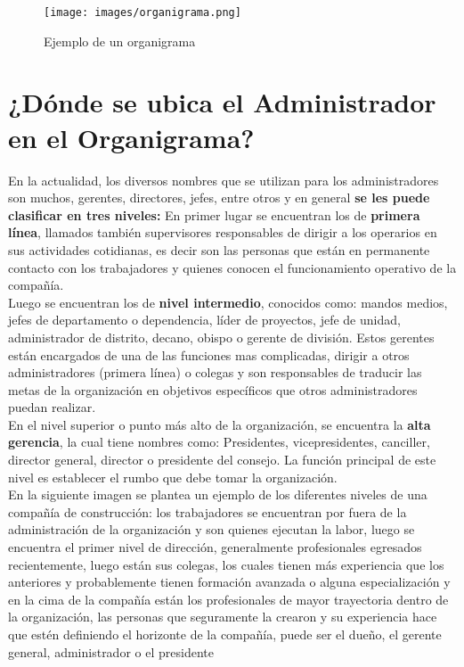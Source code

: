 \documentclass[letterpaper,12pt]{article}
\begin{document}
\begin{sloppypar}
\begin{figure}[H]
    \centering 
    \texttt{[image: images/organigrama.png]}
    \caption{Ejemplo de un organigrama}
\end{figure}

\section{¿Dónde se ubica el Administrador en el Organigrama?}
En la actualidad, los diversos nombres que se utilizan para los administradores son muchos, gerentes, directores, jefes, entre otros y en general \textbf{se les puede clasificar en tres niveles:} En primer lugar se encuentran los de \textbf{primera línea}, llamados también supervisores responsables de dirigir a los operarios en sus actividades cotidianas, es decir son las personas que están en permanente contacto con los trabajadores y quienes conocen el funcionamiento operativo de la compañía.
\vspace{0.3cm}\\
Luego se encuentran los de \textbf{nivel intermedio}, conocidos como: mandos medios, jefes de departamento o dependencia, líder de proyectos, jefe de unidad, administrador de distrito, decano, obispo o gerente de división. Estos gerentes están encargados de una de las funciones mas complicadas, dirigir a otros administradores (primera línea) o colegas y son responsables de traducir las metas de la organización en objetivos específicos que otros administradores puedan realizar.
\vspace{0.3cm}\\
En el nivel superior o punto más alto de la organización, se encuentra la \textbf{alta gerencia}, la cual tiene nombres como: Presidentes, vicepresidentes, canciller, director general, director o presidente del consejo. La función principal de este nivel es establecer el rumbo que debe tomar la organización.
\vspace{0.3cm}\\
En la siguiente imagen se plantea un ejemplo de los diferentes niveles de una compañía de construcción: los trabajadores se
encuentran por fuera de la administración de la organización y son quienes ejecutan la labor, luego se encuentra el primer nivel de dirección, generalmente profesionales egresados recientemente, luego están sus colegas, los cuales tienen más experiencia que los anteriores y probablemente tienen formación avanzada o alguna especialización y en la cima de la compañía están los profesionales de mayor trayectoria dentro de la organización, las personas que seguramente la crearon y su experiencia hace que estén definiendo el horizonte de la compañía, puede ser el dueño, el gerente
general, administrador o el presidente


\end{sloppypar}
\end{document}
